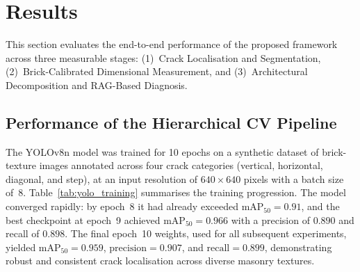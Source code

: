 %

\section{Results}
\label{sec:results}

\begin{sloppypar}
This section evaluates the end-to-end performance of the proposed framework
across three measurable stages: (1)~Crack Localisation and Segmentation,
(2)~Brick-Calibrated Dimensional Measurement, and (3)~Architectural
Decomposition and RAG-Based Diagnosis.
\end{sloppypar}

\subsection{Performance of the Hierarchical CV Pipeline}
\label{subsec:yolo_results}

\begin{sloppypar}
The YOLOv8n model was trained for 10 epochs on a synthetic dataset of
brick-texture images annotated across four crack categories
(vertical, horizontal, diagonal, and step), at an input resolution of
$640\times640$ pixels with a batch size of~8.
Table~\ref{tab:yolo_training} summarises the training progression.
The model converged rapidly: by epoch~8 it had already exceeded
$\mathrm{mAP}_{50} = 0.91$, and the best checkpoint at epoch~9 achieved
$\mathrm{mAP}_{50} = 0.966$ with a precision of $0.890$ and recall of $0.898$.
The final epoch~10 weights, used for all subsequent experiments, yielded
$\mathrm{mAP}_{50} = 0.959$, $\mathrm{precision} = 0.907$, and
$\mathrm{recall} = 0.899$, demonstrating robust and consistent crack
localisation across diverse masonry textures.
\end{sloppypar}

